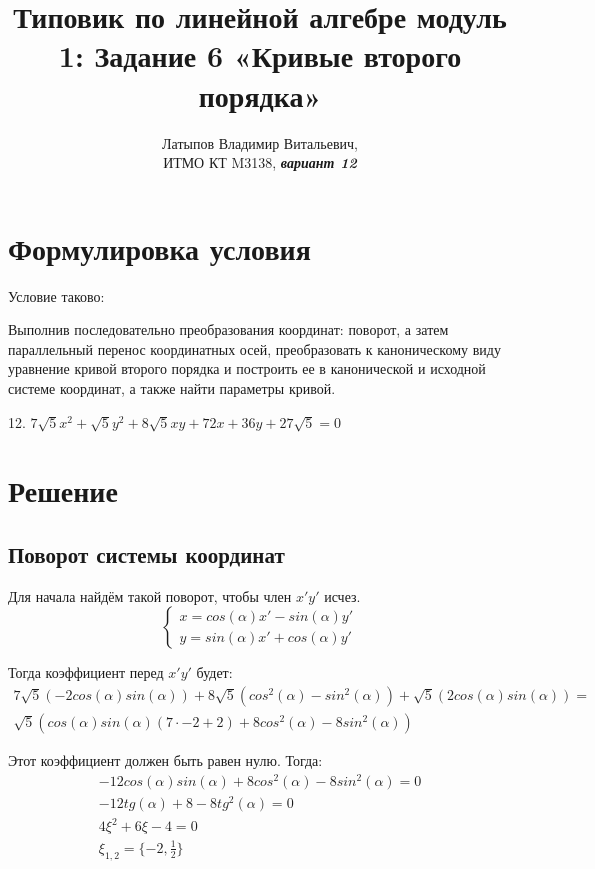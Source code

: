 \documentclass[12pt, a4paper]{article}
\author{Латыпов Владимир Витальевич, \\ ИТМО КТ M3138, \Huge{\textit{\textbf{вариант 12}}}}
\title{Типовик по линейной алгебре модуль 1: Задание 6 «Кривые второго порядка»}
\begin{document}
    \tittoc

    \section{Формулировка условия}

    \begin{statement}
        Условие таково: 
        
        Выполнив последовательно преобразования координат: поворот, а
        затем параллельный перенос координатных осей, преобразовать к
        каноническому виду уравнение кривой второго порядка и построить ее в
        канонической и исходной системе координат, а также найти параметры
        кривой.

        12. $7\sqrt{5} x^2 + \sqrt{5}y^2 + 8\sqrt{5}xy + 72x + 36y + 27\sqrt{5} = 0$
    \end{statement}

    \section{Решение}


    \subsection{Поворот системы координат}
    
    Для начала найдём такой поворот, чтобы член $x'y'$ исчез.
    \begin{equation}
        \begin{cases}
            x = cos(\alpha) x' - sin(\alpha) y' \\
            y = sin(\alpha) x' + cos(\alpha) y'
        \end{cases}
    \end{equation}

    Тогда коэффициент перед $x'y'$ будет:
    \begin{multline}
        7\sqrt{5} \left( -2 cos(\alpha) sin(\alpha) \right) + 8\sqrt{5} \left( cos^2(\alpha) - sin^2(\alpha) \right) + \sqrt{5} \left( 2 cos(\alpha) sin(\alpha) \right) = \\
        \sqrt{5} ( cos(\alpha) sin(\alpha) (7 \cdot -2 + 2) + 8 cos^2(\alpha) - 8 sin^2(\alpha) )
    \end{multline}

    Этот коэффициент должен быть равен нулю. Тогда:
    \begin{gather}
        -12 cos(\alpha) sin(\alpha) + 8cos^2(\alpha) - 8sin^2(\alpha) = 0 \\
        -12tg(\alpha) + 8 - 8tg^2(\alpha) = 0 \\
        4\xi^2 + 6\xi - 4 = 0 \\
        \xi_{1, 2} = \{ -2, \frac{1}{2} \}
    \end{gather}
\end{document}
